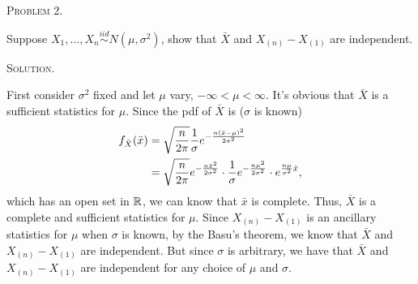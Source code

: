\documentclass{article}
\begin{document}
\begin{CJK}{UTF8}{gbsn}
    \begin{shaded}
        \noindent\textsc{Problem 2.}\par
        Suppose $X_1,\ldots,X_n \mathop{\sim}\limits^{iid}N(\mu, \sigma^2)$, show that $\bar{X}$
        and $X_{(n)} - X_{(1)}$ are independent.
    \end{shaded}
    \noindent\textsc{Solution.}\par
    First consider $\sigma^2$ fixed and let $\mu$ vary, $-\infty < \mu < \infty$. It's obvious that
    $\bar{X}$ is a sufficient statistics for $\mu$.
    Since the pdf of $\bar{X}$ is ($\sigma$ is known)
    \begin{align}
        f_{\bar{X}}(\bar{x}) & = \sqrt{\frac{n}{2\pi}} \frac{1}{\sigma} e^{-\frac{n(\bar{x} - \mu)^2}{2\sigma^2}} \notag                                                                  \\
                             & =\sqrt{\frac{n}{2\pi}} e^{-\frac{n\bar{x}^2}{2\sigma^2}} \cdot\frac{1}{\sigma} e^{-\frac{n\mu^2}{2\sigma^2}} \cdot e^{\frac{n\mu}{\sigma^2}\bar{x}},\notag
    \end{align}
    which has an open set in ${\mathbb R}$,
    we can know that $\bar{x}$ is complete.
    Thus, $\bar{X}$ is a complete and sufficient statistics for $\mu$.
    Since $X_{(n)} - X_{(1)}$ is an ancillary statistics for $\mu$ when $\sigma$ is known, by the Basu's theorem, we know
    that $\bar{X}$ and $X_{(n)} - X_{(1)}$ are independent.
    But since $\sigma$  is arbitrary, we have that $\bar{X}$ and $X_{(n)} - X_{(1)}$ are independent for
    any choice of $\mu$ and $\sigma$.



\end{CJK}
\end{document}

